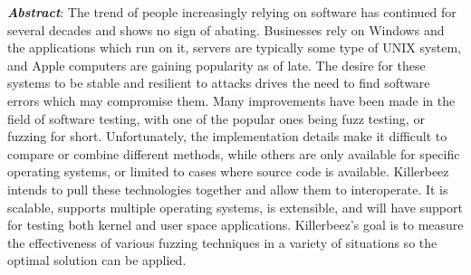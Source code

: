 \textbf{\textit{Abstract}}:
The trend of people increasingly relying on software has continued for
several decades and shows no sign of abating. Businesses rely on Windows and
the applications which run on it, servers are typically some type of UNIX
system, and Apple computers are gaining popularity as of late. The desire
for these systems to be stable and resilient to attacks drives the need to find
software errors which may compromise them. Many improvements have been
made in the field of software testing, with one of the popular ones being fuzz
testing, or fuzzing for short.  Unfortunately, the implementation details make
it difficult to compare or combine different methods, while others are only
available for specific operating systems, or limited to cases where source
code is available.  Killerbeez intends to pull these technologies together
and allow them to interoperate. It is scalable, supports multiple operating
systems, is extensible, and will have support for testing both kernel and
user space applications. Killerbeez's goal is to measure the effectiveness
of various fuzzing techniques in a variety of situations so the optimal
solution can be applied. 
